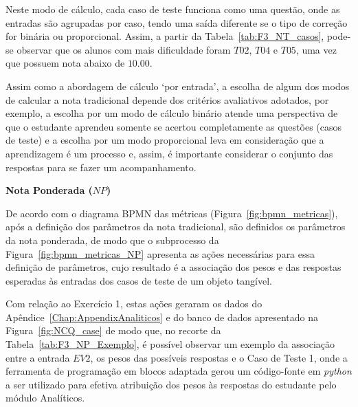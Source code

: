 Neste modo de cálculo, cada caso de teste funciona como uma questão, onde as entradas são agrupadas por caso, tendo uma saída diferente se o tipo de correção for binária ou proporcional. Assim, a partir da Tabela~\ref{tab:F3_NT_casos}, pode-se observar que os alunos com mais dificuldade foram $T02$, $T04$ e $T05$, uma vez que possuem nota abaixo de $10.00$. 

Assim como a abordagem de cálculo `por entrada', a escolha de algum dos modos de calcular a nota tradicional depende dos critérios avaliativos adotados, por exemplo, a escolha por um modo de cálculo binário atende uma perspectiva de que o estudante aprendeu somente se acertou completamente as questões (casos de teste) e a escolha por um modo proporcional leva em consideração que a aprendizagem é um processo e, assim, é importante considerar o conjunto das respostas para se fazer um acompanhamento.

\textbf{Nota Ponderada ($NP$)}

De acordo com o diagrama BPMN das métricas (Figura~\ref{fig:bpmn_metricas}), após a definição dos parâmetros da nota tradicional, são definidos os parâmetros da nota ponderada, de modo que o subprocesso da Figura~\ref{fig:bpmn_metricas_NP} apresenta as ações necessárias para essa definição de parâmetros, cujo resultado é a associação dos pesos e das respostas esperadas às entradas dos casos de teste de um objeto tangível. 

Com relação ao Exercício 1, estas ações geraram os dados do Apêndice~\ref{Chap:AppendixAnaliticos} e do banco de dados apresentado na Figura~\ref{fig:NCQ_case} de modo que, no recorte da Tabela~\ref{tab:F3_NP_Exemplo}, é possível observar um exemplo da associação entre a entrada $EV2$, os pesos das possíveis respostas e o Caso de Teste 1, onde a ferramenta de programação em blocos adaptada gerou um código-fonte em \textit{python} a ser utilizado para efetiva atribuição dos pesos às respostas do estudante pelo módulo Analíticos.

